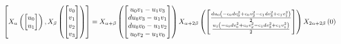 \documentclass[11pt]{article}
\theoremstyle{definition}
\begin{document}
\[
\scaletoalign{\textwidth}{\left[ X_{\alpha}\left(\left[\begin{matrix}u_{0}\\u_{1}\end{matrix}\right]\right), X_{\beta}\left(\left[\begin{matrix}v_{0}\\v_{1}\\v_{2}\\v_{3}\end{matrix}\right]\right) \right] = X_{\alpha + \beta}\left(\left[\begin{matrix}u_{0} v_{1} - u_{1} v_{3}\\d u_{0} v_{3} - u_{1} v_{1}\\d u_{0} v_{0} - u_{1} v_{2}\\u_{0} v_{2} - u_{1} v_{0}\end{matrix}\right]\right) X_{\alpha + 2\beta}\left(\left[\begin{matrix}\frac{d u_{0} \left(- c_{0} d v_{0}^{2} + c_{0} v_{2}^{2} - c_{1} d v_{3}^{2} + c_{1} v_{1}^{2}\right)}{2}\\\frac{u_{1} \left(- c_{0} d v_{0}^{2} + c_{0} v_{2}^{2} - c_{1} d v_{3}^{2} + c_{1} v_{1}^{2}\right)}{2}\end{matrix}\right]\right) X_{2\alpha + 2\beta}\left(0\right)}
\]
\end{document}
